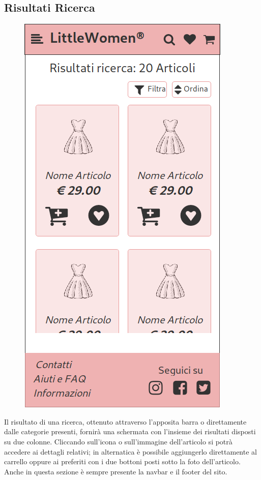 \documentclass[12pt,a4paper]{report}
\begin{document}
\subsection{Risultati Ricerca}
\begin{figure}
\centering
\includegraphics[height=0.4\textheight]{"Project Management Sources/Wireframe/WireFrame Screenshot/Mobile/Risultati ricerca"}
\vspace{-100pt}
\end{figure}
Il risultato di una ricerca, ottenuto attraverso l'apposita barra o direttamente dalle categorie presenti, fornirà una schermata con l'insieme dei risultati disposti su due colonne. Cliccando sull'icona o sull'immagine dell'articolo si potrà accedere ai dettagli relativi; in alternatica è possibile aggiungerlo direttamente al carrello oppure ai preferiti con i due bottoni posti sotto la foto dell'articolo. Anche in questa sezione è sempre presente la navbar e il footer del sito.\\
\end{document}
